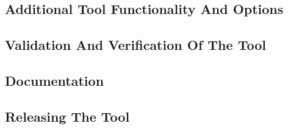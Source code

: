 \subsection{Additional Tool Functionality And Options}

\subsection{Validation And Verification Of The Tool}

\subsection{Documentation}

\subsection{Releasing The Tool}
